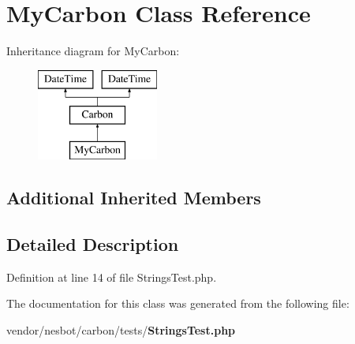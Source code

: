\section{My\+Carbon Class Reference}
\label{class_my_carbon}
Inheritance diagram for My\+Carbon\+:\begin{figure}[H]
\begin{center}
\leavevmode
\includegraphics[height=3.000000cm]{class_my_carbon}
\end{center}
\end{figure}
\subsection*{Additional Inherited Members}


\subsection{Detailed Description}


Definition at line 14 of file Strings\+Test.\+php.



The documentation for this class was generated from the following file\+:\begin{DoxyCompactItemize}
\item 
vendor/nesbot/carbon/tests/{\bf Strings\+Test.\+php}\end{DoxyCompactItemize}
